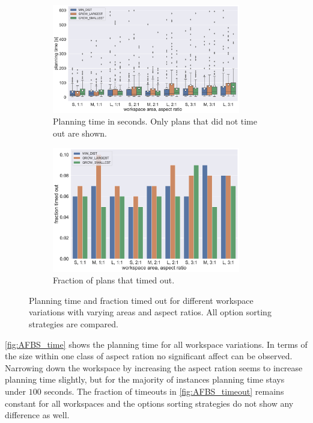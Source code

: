 \begin{figure}
	\centering
	\begin{subfigure}[b]{\textwidth}
		\centering
		\includegraphics[width=0.9\textwidth]{figures/plots/AFBS_time.pdf}
		\caption{Planning time in seconds. Only plans that did not time out are shown.}
		\label{fig:AFBS_time}
	\end{subfigure}
	
	\begin{subfigure}[b]{\textwidth}
		\centering
		\includegraphics[width=0.9\textwidth]{figures/plots/AFBS_timeout.pdf}
		\caption{Fraction of plans that timed out.}
		\label{fig:AFBS_timeout}
	\end{subfigure}
	\caption[Planning time and fraction timed out for different workspace variations]{Planning time and fraction timed out for different workspace variations with varying areas and aspect ratios. All option sorting strategies are compared.}
	\label{fig:AFBS_timestats}
\end{figure}

\autoref{fig:AFBS_time} shows the planning time for all workspace variations.
In terms of the size within one class of aspect ration no significant affect can be observed.
Narrowing down the workspace by increasing the aspect ration seems to increase planning time slightly, but for the majority of instances planning time stays under $100$ seconds.
The fraction of timeouts in \autoref{fig:AFBS_timeout} remains constant for all workspaces and the options sorting strategies do not show any difference as well.

